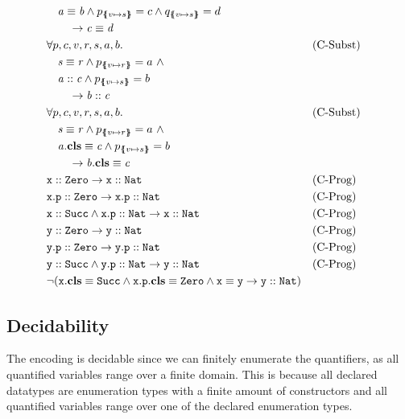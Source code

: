 \documentclass[a4paper]{article}
\begin{document}
\begin{align}
  &\quad \pathEq{a}{b} \land
         \subst{p}{v}{s}=c \land \subst{q}{v}{s}=d\\
  &\qquad \rightarrow \pathEq{c}{d}\\
  &\forall p, c, v, r, s, a, b. && \text{(C-Subst)}\\
  &\quad \pathEq{s}{r} \land \subst{p}{v}{r}=a~\land\\
  &\quad \instOf{a}{c} \land
         \subst{p}{v}{s}=b\\
  &\qquad \rightarrow \instOf{b}{c}\\
  &\forall p, c, v, r, s, a, b. && \text{(C-Subst)}\\
  &\quad \pathEq{s}{r} \land \subst{p}{v}{r}=a~\land\\
  &\quad \instBy{a}{c} \land
         \subst{p}{v}{s}=b\\
  &\qquad \rightarrow \instBy{b}{c}\\
  &\instOf{\mathtt{x}}{\Zero} \rightarrow \instOf{\mathtt{x}}{\Nat} && \text{(C-Prog)}\\
  &\instOf{\mathtt{x.p}}{\Zero} \rightarrow \instOf{\mathtt{x.p}}{\Nat} && \text{(C-Prog)}\\
  &\instOf{\mathtt{x}}{\Succ} \land \instOf{\mathtt{x.p}}{\Nat} \rightarrow \instOf{\mathtt{x}}{\Nat} && \text{(C-Prog)}\\
  &\instOf{\mathtt{y}}{\Zero} \rightarrow \instOf{\mathtt{y}}{\Nat} && \text{(C-Prog)}\\
  &\instOf{\mathtt{y.p}}{\Zero} \rightarrow \instOf{\mathtt{y.p}}{\Nat} && \text{(C-Prog)}\\
  &\instOf{\mathtt{y}}{\Succ} \land \instOf{\mathtt{y.p}}{\Nat} \rightarrow \instOf{\mathtt{y}}{\Nat} && \text{(C-Prog)}\\
  &\neg (\instBy{\mathtt{x}}{\Succ} \land \instBy{\mathtt{x.p}}{\Zero} \land \pathEq{\mathtt{x}}{\mathtt{y}} \rightarrow \instOf{\mathtt{y}}{\Nat})
\end{align}

\subsection{Decidability}
\label{sec:smt-depth-limit-decidability}
The encoding is decidable since we can finitely enumerate the quantifiers,
as all quantified variables range over a finite domain.
This is because all declared datatypes are enumeration types
with a finite amount of constructors and all quantified variables
range over one of the declared enumeration types.
\end{document}
